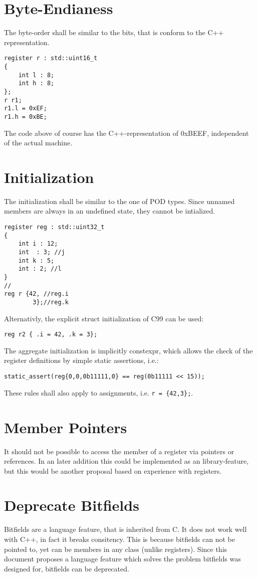 \documentclass{report}
\begin{document}
\section{Byte-Endianess}
The byte-order shall be similar to the bits, that is conform to the C++
representation.
\begin{lstlisting}
register r : std::uint16_t
{
	int l : 8;
	int h : 8;
};
r r1;
r1.l = 0xEF;
r1.h = 0xBE;
\end{lstlisting}
The code above of course has the C++-representation of 0xBEEF, independent of
the actual machine.
\section{Initialization}
The initialization shall be similar to the one of POD types. Since unnamed
members are always in an undefined state, they cannot be intialized.
\begin{lstlisting}
register reg : std::uint32_t
{
	int i : 12;
	int  : 3; //j
	int k : 5;
	int : 2; //l
}
//
reg r {42, //reg.i
		3};//reg.k

\end{lstlisting}
Alternativly, the explicit struct initialization of C99 can be used:
\begin{lstlisting}
reg r2 { .i = 42, .k = 3};
\end{lstlisting}
The aggregate initialization is implicitly constexpr, which allows the check of
the register definitions by simple static assertions, i.e.:
\begin{lstlisting}
static_assert(reg{0,0,0b11111,0} == reg(0b11111 << 15));  
\end{lstlisting}

These rules shall also apply to assignments, i.e. \lstinline|r = {42,3};|.

\section{Member Pointers}
It should not be possible to access the member of a register via pointers or references. In an later addition this could be implemented as an library-feature, but this would be another proposal based on experience with registers.

\section{Deprecate Bitfields}
Bitfields are a language feature, that is inherited from C. It does not work well with C++, in fact it breaks consitency. This is because bitfields can not be pointed to, yet can be members in any class (unlike registers). Since this document proposes a language feature which solves the problem bitfields was designed for, bitfields can be deprecated.
\end{document}
